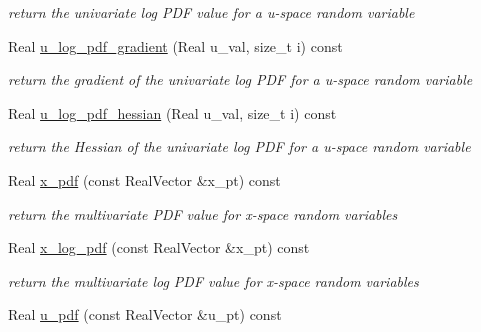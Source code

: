 \begin{DoxyCompactItemize}
\begin{DoxyCompactList}\small\item\em return the univariate log P\+DF value for a u-\/space random variable \end{DoxyCompactList}\item 
Real \hyperlink{classPecos_1_1ProbabilityTransformation_ad08fa13b4c1f55c3ead9f51bd13b1406}{u\+\_\+log\+\_\+pdf\+\_\+gradient} (Real u\+\_\+val, size\+\_\+t i) const \label{classPecos_1_1ProbabilityTransformation_ad08fa13b4c1f55c3ead9f51bd13b1406}

\begin{DoxyCompactList}\small\item\em return the gradient of the univariate log P\+DF for a u-\/space random variable \end{DoxyCompactList}\item 
Real \hyperlink{classPecos_1_1ProbabilityTransformation_aa833ef67a2780681b0fd6cd532477b1e}{u\+\_\+log\+\_\+pdf\+\_\+hessian} (Real u\+\_\+val, size\+\_\+t i) const \label{classPecos_1_1ProbabilityTransformation_aa833ef67a2780681b0fd6cd532477b1e}

\begin{DoxyCompactList}\small\item\em return the Hessian of the univariate log P\+DF for a u-\/space random variable \end{DoxyCompactList}\item 
Real \hyperlink{classPecos_1_1ProbabilityTransformation_a8cd30f9abafc0717e8d8ba5cb6718a95}{x\+\_\+pdf} (const Real\+Vector \&x\+\_\+pt) const \label{classPecos_1_1ProbabilityTransformation_a8cd30f9abafc0717e8d8ba5cb6718a95}

\begin{DoxyCompactList}\small\item\em return the multivariate P\+DF value for x-\/space random variables \end{DoxyCompactList}\item 
Real \hyperlink{classPecos_1_1ProbabilityTransformation_ac1c3dfedce5859aaa9d7eb3502de9930}{x\+\_\+log\+\_\+pdf} (const Real\+Vector \&x\+\_\+pt) const \label{classPecos_1_1ProbabilityTransformation_ac1c3dfedce5859aaa9d7eb3502de9930}

\begin{DoxyCompactList}\small\item\em return the multivariate log P\+DF value for x-\/space random variables \end{DoxyCompactList}\item 
Real \hyperlink{classPecos_1_1ProbabilityTransformation_a2db2af6368ce2da002cc18784d11c362}{u\+\_\+pdf} (const Real\+Vector \&u\+\_\+pt) const \label{classPecos_1_1ProbabilityTransformation_a2db2af6368ce2da002cc18784d11c362}


\end{DoxyCompactItemize}

